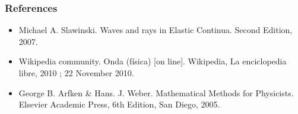 \documentclass{beamer}
\begin{document}
%
\begin{frame}\frametitle{References}
\begin{itemize}
\item Michael A. Slawinski. Waves and rays in Elastic Continua. Second Edition, 2007.
 
\item Wikipedia community. Onda (f\'isica) [on line]. Wikipedia, La enciclopedia libre, 2010 ; 22 November 2010. 

\item George B. Arfken \& Hans. J. Weber. Mathematical Methods for Physicists. Elsevier Academic Press, 6th Edition, San Diego, 2005.
\end{itemize}
\end{frame}
\end{document}
